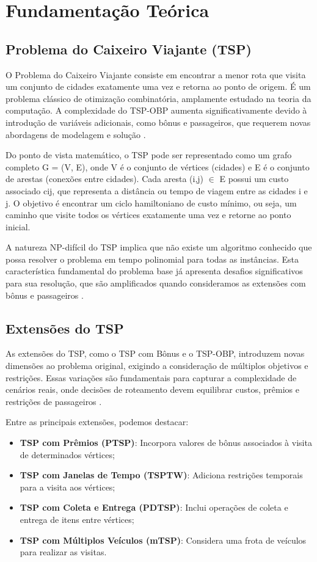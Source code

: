 \documentclass[12pt, a4paper]{report}
\begin{document}
\chapter{Fundamentação Teórica}

\section{Problema do Caixeiro Viajante (TSP)}
O Problema do Caixeiro Viajante consiste em encontrar a menor rota que visita um conjunto de cidades exatamente uma vez e retorna ao ponto de origem. É um problema clássico de otimização combinatória, amplamente estudado na teoria da computação. A complexidade do TSP-OBP aumenta significativamente devido à introdução de variáveis adicionais, como bônus e passageiros, que requerem novas abordagens de modelagem e solução \cite{lopesfilho2019}.

Do ponto de vista matemático, o TSP pode ser representado como um grafo completo G = (V, E), onde V é o conjunto de vértices (cidades) e E é o conjunto de arestas (conexões entre cidades). Cada aresta (i,j) $\in$ E possui um custo associado cij, que representa a distância ou tempo de viagem entre as cidades i e j. O objetivo é encontrar um ciclo hamiltoniano de custo mínimo, ou seja, um caminho que visite todos os vértices exatamente uma vez e retorne ao ponto inicial.

A natureza NP-difícil do TSP implica que não existe um algoritmo conhecido que possa resolver o problema em tempo polinomial para todas as instâncias. Esta característica fundamental do problema base já apresenta desafios significativos para sua resolução, que são amplificados quando consideramos as extensões com bônus e passageiros .

\section{Extensões do TSP}
As extensões do TSP, como o TSP com Bônus e o TSP-OBP, introduzem novas dimensões ao problema original, exigindo a consideração de múltiplos objetivos e restrições. Essas variações são fundamentais para capturar a complexidade de cenários reais, onde decisões de roteamento devem equilibrar custos, prêmios e restrições de passageiros \cite{carvalho2022}.

Entre as principais extensões, podemos destacar:

\begin{itemize}
    \item \textbf{TSP com Prêmios (PTSP)}: Incorpora valores de bônus associados à visita de determinados vértices;
    \item \textbf{TSP com Janelas de Tempo (TSPTW)}: Adiciona restrições temporais para a visita aos vértices;
    \item \textbf{TSP com Coleta e Entrega (PDTSP)}: Inclui operações de coleta e entrega de itens entre vértices;
    \item \textbf{TSP com Múltiplos Veículos (mTSP)}: Considera uma frota de veículos para realizar as visitas.
\end{itemize}
\end{document}
